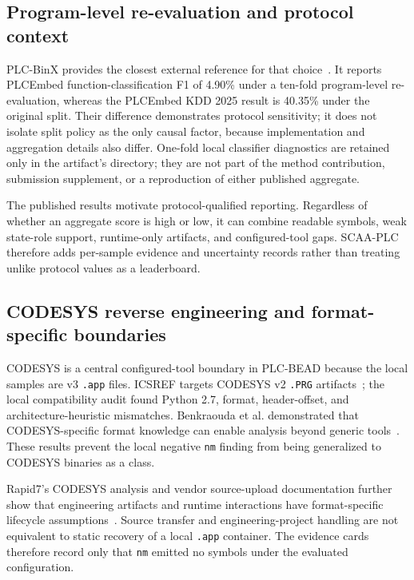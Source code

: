 \documentclass[manuscript,screen,review]{acmart}
\begin{document}
\subsection{Program-level re-evaluation and protocol context}

PLC-BinX provides the closest external reference for that choice~\cite{plcbinx_arxiv2026}. It reports PLCEmbed function-classification F1 of 4.90\% under a ten-fold program-level re-evaluation, whereas the PLCEmbed KDD 2025 result is 40.35\% under the original split. Their difference demonstrates protocol sensitivity; it does not isolate split policy as the only causal factor, because implementation and aggregation details also differ. One-fold local classifier diagnostics are retained only in the artifact's  directory; they are not part of the method contribution, submission supplement, or a reproduction of either published aggregate.

The published results motivate protocol-qualified reporting. Regardless of whether an aggregate score is high or low, it can combine readable symbols, weak state-role support, runtime-only artifacts, and configured-tool gaps. SCAA-PLC therefore adds per-sample evidence and uncertainty records rather than treating unlike protocol values as a leaderboard.

\subsection{CODESYS reverse engineering and format-specific boundaries}

CODESYS is a central configured-tool boundary in PLC-BEAD because the local samples are v3 \texttt{.app} files. ICSREF targets CODESYS v2 \texttt{.PRG} artifacts~\cite{icsref_ndss2019}; the local compatibility audit found Python 2.7, format, header-offset, and architecture-heuristic mismatches. Benkraouda et al. demonstrated that CODESYS-specific format knowledge can enable analysis beyond generic tools~\cite{benkraouda_codesys2023}. These results prevent the local negative \texttt{nm} finding from being generalized to CODESYS binaries as a class.

Rapid7's CODESYS analysis and vendor source-upload documentation further show that engineering artifacts and runtime interactions have format-specific lifecycle assumptions~\cite{rapid7_codesys_whitepaper2023,codesys_source_upload_docs}. Source transfer and engineering-project handling are not equivalent to static recovery of a local \texttt{.app} container. The evidence cards therefore record only that \texttt{nm} emitted no symbols under the evaluated configuration.
\end{document}
